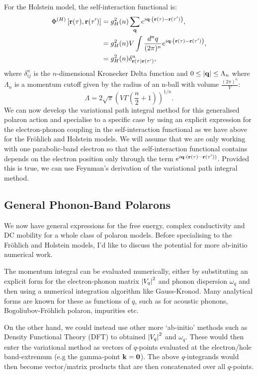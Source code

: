 For the Holstein model, the self-interaction functional is:
\begin{equation}
    \begin{aligned}
        \Phi^{(H)}\left[\vb{r}(\tau), \vb{r}(\tau')\right] &= g_H^2(n) \sum_{\vb{q}} e^{i \vb{q} \cdot \left(\vb{r}(\tau) - \vb{r}(\tau') \right)} ,\\
        &= g_{H}^2(n) V \int \frac{d^n q}{(2\pi)^n} e^{i\vb{q}\cdot\left(\vb{r}(\tau) - \vb{r}(\tau')\right)}, \\
        &= g_H^2(n) \delta^n_{\vb{r}(\tau)\vb{r}(\tau')} ,
    \end{aligned}
\end{equation}
where $\delta^n_{ij}$ is the $n$-dimensional Kronecker Delta function and $0 \leq \abs{\vb{q}} \leq \Lambda_n$ where $\Lambda_n$ is a momentum cutoff given by the radius of an n-ball with volume $\frac{(2\pi)^n}{V}$:
\begin{equation}
    \Lambda = 2\sqrt{\pi} \left(V \Gamma\left(\frac{n}{2} + 1\right)\right)^{1/n}.
\end{equation}
We can now develop the variational path integral method for this generalised polaron action and specialise to a specific case by using an explicit expression for the electron-phonon coupling in the self-interaction functional as we have above for the Fr\"ohlich and Holstein models. We will assume that we are only working with one parabolic-band electron so that the self-interaction functional contains depends on the electron position only through the term $e^{i \vb{q} \cdot (\vb{r}(\tau) - \vb{r}(\tau'))}$. Provided this is true, we can use Feynman's derivation of the variational path integral method.

\subsection{General Phonon-Band Polarons}

We now have general expressions for the free energy, complex conductivity and DC mobility for a whole class of polaron models. Before specialising to the Fr\"ohlich and Holstein models, I'd like to discuss the potential for more ab-initio numerical work. 
\newline

The momentum integral can be evaluated numerically, either by substituting an explicit form for the electron-phonon matrix $\abs{V_q}^2$ and phonon dispersion $\omega_q$ and then using a numerical integration algorithm like Gauss-Kronod. Many analytical forms are known for these as functions of $q$, such as for acoustic phonons, Bogoliubov-Fröhlich polaron, impurities etc.
\newline 

On the other hand, we could instead use other more `ab-initio' methods such as Density Functional Theory (DFT) to obtained $\abs{V_q}^2$ and $\omega_q$. These would then enter the variational method as vectors of $q$-points evaluated at the electron/hole band-extremum (e.g the gamma-point $\vb{k} = \vb{0}$). The above $q$-integrands would then become vector/matrix products that are then concatenated over all $q$-points.